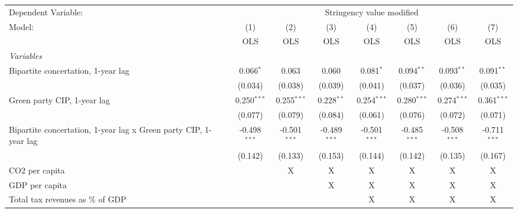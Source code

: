 
\begingroup
\centering
\begin{tabular}{lccccccc}
   \toprule
   Dependent Variable: & \multicolumn{7}{c}{Stringency value modified}\\
   Model:                                                           & (1)            & (2)            & (3)            & (4)            & (5)            & (6)            & (7)\\  
                                                                    &  OLS           & OLS            & OLS            & OLS            & OLS            & OLS            & OLS\\  
   \midrule
   \emph{Variables}\\
   Bipartite concertation, 1-year lag                               & 0.066$^{*}$    & 0.063          & 0.060          & 0.081$^{*}$    & 0.094$^{**}$   & 0.093$^{**}$   & 0.091$^{**}$\\   
                                                                    & (0.034)        & (0.038)        & (0.039)        & (0.041)        & (0.037)        & (0.036)        & (0.035)\\   
   Green party CIP, 1-year lag                                      & 0.250$^{***}$  & 0.255$^{***}$  & 0.228$^{**}$   & 0.254$^{***}$  & 0.280$^{***}$  & 0.274$^{***}$  & 0.361$^{***}$\\   
                                                                    & (0.077)        & (0.079)        & (0.084)        & (0.061)        & (0.076)        & (0.072)        & (0.071)\\   
   Bipartite concertation, 1-year lag x Green party CIP, 1-year lag & -0.498$^{***}$ & -0.501$^{***}$ & -0.489$^{***}$ & -0.501$^{***}$ & -0.485$^{***}$ & -0.508$^{***}$ & -0.711$^{***}$\\   
                                                                    & (0.142)        & (0.133)        & (0.153)        & (0.144)        & (0.142)        & (0.135)        & (0.167)\\   
   CO2 per capita                                                   &                & X              & X              & X              & X              & X              & X\\  
   GDP per capita                                                   &                &                & X              & X              & X              & X              & X\\  
   Total tax revenues as \% of GDP                                  &                &                &                & X              & X              & X              & X\\  

\end{tabular}
